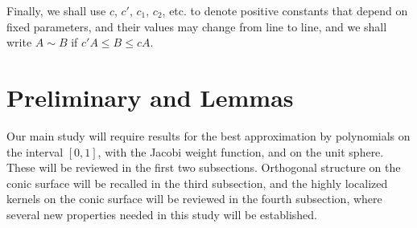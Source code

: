 \documentclass{amsart}
\theoremstyle{remark}
\begin{document}
Finally, we shall use $c$, $c'$, $c_1$, $c_2$, etc. to denote positive constants that depend on fixed 
parameters, and their values may change from line to line, and we shall write $A \sim B$ if $ c' A \le B \le c A$. 

\section{Preliminary and Lemmas} \label{sec:2}
\setcounter{equation}{0}

Our main study will require results for the best approximation by polynomials on the interval $[0,1]$, with the Jacobi 
weight function, and on the unit sphere. These will be reviewed in the first two subsections. Orthogonal structure 
on the conic surface will be recalled in the third subsection, and the highly localized kernels on the conic surface  
will be reviewed in the fourth subsection, where several new properties needed in this study will be established. 
\end{document}
